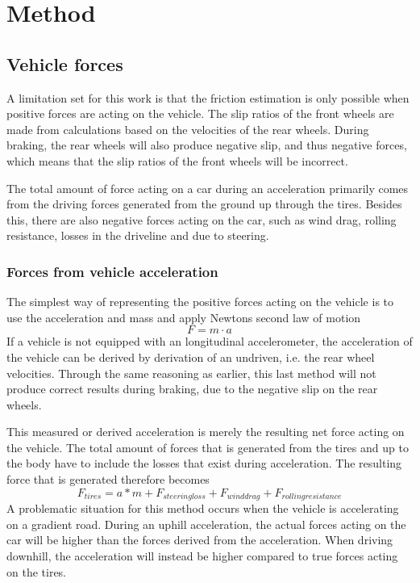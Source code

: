 \chapter{Method}

\section{Vehicle forces}

A limitation set for this work is that the friction estimation is only possible when positive forces are acting on the vehicle. The slip ratios of the front wheels are made from calculations based on the velocities of the rear wheels. During braking, the rear wheels will also produce negative slip, and thus negative forces, which means that the slip ratios of the front wheels will be incorrect. 

The total amount of force acting on a car during an acceleration primarily comes from the driving forces generated from the ground up through the tires. Besides this, there are also negative forces acting on the car, such as wind drag, rolling resistance, losses in the driveline and due to steering. 

\subsection{Forces from vehicle acceleration}

The simplest way of representing the positive forces acting on the vehicle is to use the acceleration and mass and apply Newtons second law of motion
\begin{equation}
	F = m \cdot a
\end{equation}
If a vehicle is not equipped with an longitudinal accelerometer, the acceleration of the vehicle can be derived by derivation of an undriven, i.e. the rear wheel velocities. Through the same reasoning as earlier, this last method will not produce correct results during braking, due to the negative slip on the rear wheels. 

This measured or derived acceleration is merely the resulting net force acting on the vehicle. The total amount of forces that is generated from the tires and up to the body have to include the losses that exist during acceleration. The resulting force that is generated therefore becomes 
\begin{equation}
F_{tires} = a*m + F_{steering loss} + F_{wind drag} + F_{rolling resistance}
\end{equation}
A problematic situation for this method occurs when the vehicle is accelerating on a gradient road. During an uphill acceleration, the actual forces acting on the car will be higher than the forces derived from the acceleration. When driving downhill, the acceleration will instead be  higher compared to true forces acting on the tires. 

